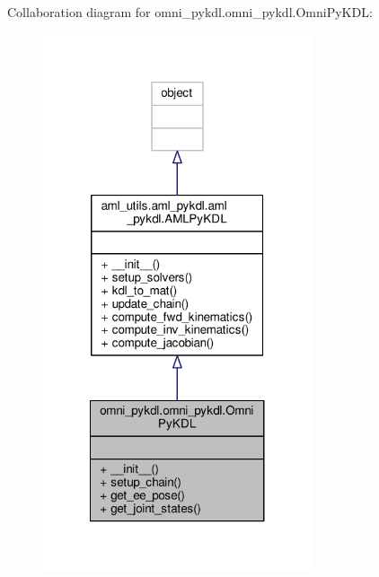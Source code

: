 Collaboration diagram for omni\-\_\-pykdl.\-omni\-\_\-pykdl.\-Omni\-Py\-K\-D\-L\-:
\nopagebreak
\begin{figure}[H]
\begin{center}
\leavevmode
\includegraphics[width=224pt]{classomni__pykdl_1_1omni__pykdl_1_1_omni_py_k_d_l__coll__graph}
\end{center}
\end{figure}
